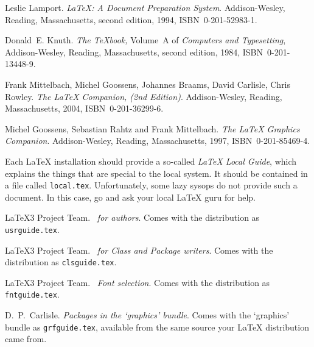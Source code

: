 \begin{thebibliography}{99}
 Leslie Lamport.  \newblock \emph{{\LaTeX:} A Document
    Preparation System}.  \newblock Addison-Wesley, Reading,
  Massachusetts, second edition, 1994, ISBN~0-201-52983-1.
  
 Donald~E. Knuth.  \newblock \textit{The \TeX{}book,}
  Volume~A of \textit{Computers and Typesetting}, Addison-Wesley,
  Reading, Massachusetts, second edition, 1984, ISBN~0-201-13448-9.

 Frank Mittelbach, Michel Goossens, Johannes Braams,
  David Carlisle, Chris Rowley.  \newblock \emph{The {\LaTeX} Companion, (2nd Edition)}.  \newblock
  Addison-Wesley, Reading, Massachusetts, 2004, ISBN~0-201-36299-6.

 Michel Goossens, Sebastian Rahtz and Frank
  Mittelbach.  \newblock \emph{The {\LaTeX} Graphics Companion}.  \newblock
  Addison-Wesley, Reading, Massachusetts, 1997, ISBN~0-201-85469-4.
 
 Each \LaTeX{} installation should provide a so-called
  \emph{\LaTeX{} Local Guide}, which explains the things that are
  special to the local system.  It should be contained in a file called
  \texttt{local.tex}. Unfortunately, some lazy sysops do not provide such a
  document. In this case, go and ask your local \LaTeX{} guru for help.
 
 \LaTeX3 Project Team.  \newblock \emph{\LaTeXe~for
    authors}.  \newblock Comes with the \LaTeXe{} distribution as
  \texttt{usrguide.tex}.

 \LaTeX3 Project Team.  \newblock \emph{\LaTeXe~for
    Class and Package writers}.  \newblock Comes with the \LaTeXe{}
  distribution as \texttt{clsguide.tex}.

 \LaTeX3 Project Team.  \newblock \emph{\LaTeXe~Font
    selection}.  \newblock Comes with the \LaTeXe{} distribution as
  \texttt{fntguide.tex}.

 D.~P.~Carlisle.  \newblock \emph{Packages in the
    `graphics' bundle}.  \newblock Comes with the `graphics' bundle as
  \texttt{grfguide.tex}, available from the same source your \LaTeX{}
  distribution came from.


\end{thebibliography}
